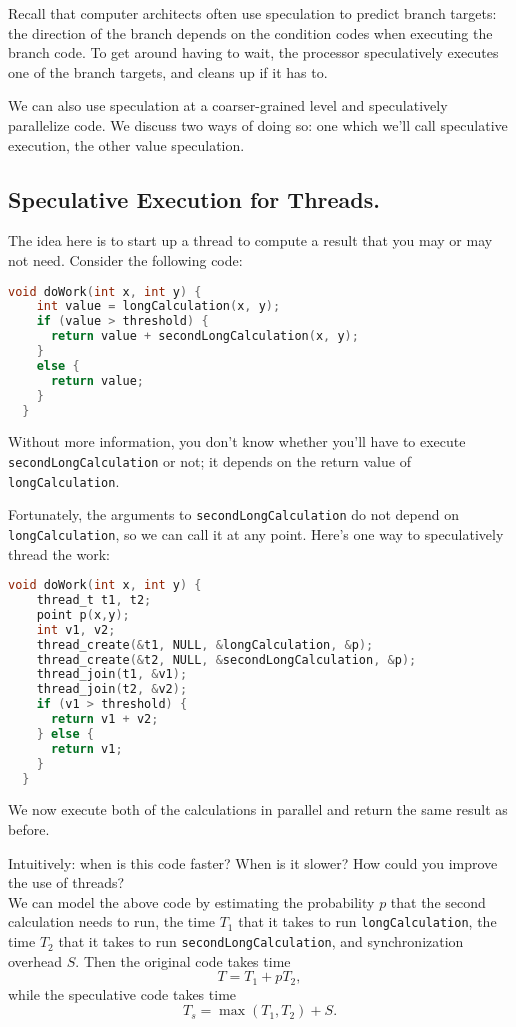 Recall that computer architects often use speculation to predict branch
targets: the direction of the branch depends on the condition codes
when executing the branch code. To get around having to wait, the processor
speculatively executes one of the branch targets, and cleans up if it
has to.

We can also use speculation at a coarser-grained level and
speculatively parallelize code. We discuss two ways of doing so: one
which we'll call speculative execution, the other value speculation.

\subsection*{Speculative Execution for Threads.} The idea here is to
start up a thread to compute a result that you may or may not need.
Consider the following code:

{\small \begin{lstlisting}[language=C]
  void doWork(int x, int y) {
    int value = longCalculation(x, y);
    if (value > threshold) {
      return value + secondLongCalculation(x, y);
    }
    else {
      return value;
    }
  }
\end{lstlisting} }
Without more information, you don't know whether you'll have to execute
{\tt secondLongCalculation} or not; it depends on the return value of
{\tt longCalculation}. 

Fortunately, the arguments to {\tt secondLongCalculation} do not
depend on {\tt longCalculation}, so we can call it at any point. 
Here's one way to speculatively thread the work:

{\small \begin{lstlisting}[language=C]
  void doWork(int x, int y) {
    thread_t t1, t2;
    point p(x,y);
    int v1, v2;
    thread_create(&t1, NULL, &longCalculation, &p);
    thread_create(&t2, NULL, &secondLongCalculation, &p);
    thread_join(t1, &v1);
    thread_join(t2, &v2);
    if (v1 > threshold) {
      return v1 + v2;
    } else {
      return v1;
    }
  }
\end{lstlisting} }
We now execute both of the calculations in parallel and return the same
result as before.

{\sf Intuitively: when is this code faster? When is it slower? How
  could you improve the use of threads?}\\[4em]

We can model the above code by estimating the probability $p$ that
the second calculation needs to run, the time $T_1$ that it takes
to run {\tt longCalculation}, the time $T_2$ that it takes to run
{\tt secondLongCalculation}, and synchronization overhead $S$.
Then the original code takes time
\[ T = T_1 + p T_2, \]
while the speculative code takes time
\[ T_s = \max(T_1, T_2) + S.\]

